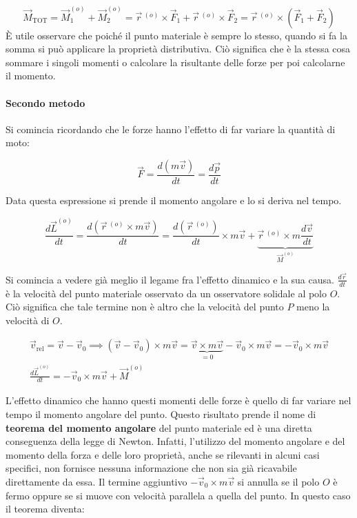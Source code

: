 \[
	\vec{M}_{\text{TOT}}=\vec{M}^{(o)}_1+\vec{M}^{(o)}_2= \vec{r}\,^{(o)} \times\vec{F}_1+\vec{r}\,^{(o)} \times \vec{F}_2= \vec{r}\,^{(o)} \times (\vec{F}_1+\vec{F}_2)
\]
È utile osservare che poiché il punto materiale è sempre lo stesso, quando si fa la somma si può applicare la proprietà distributiva. Ciò significa che è la stessa cosa sommare i singoli momenti o calcolare la risultante delle forze per poi calcolarne il momento.

\paragraph{Secondo metodo} Si comincia ricordando che le forze hanno l'effetto di far variare la quantità di moto:

\[
	\vec{F}=\frac{d(m\vec{v})}{dt}=\frac{d\vec{p}}{dt}
\]

Data questa espressione si prende il momento angolare e lo si deriva nel tempo.

\[
	\frac{d\vec{L}^{(o)}}{dt}=\frac{d(\vec{r}\,^{(o)}\times m\vec{v})}{dt}=\frac{d(\vec{r}\,^{(o)})}{dt}\times m\vec{v}+\underbrace{\vec{r}\,^{(o)}\times m\frac{d\vec{v}}{dt}}_{\vec{M}^{(o)}}
\]

Si comincia a vedere già meglio il legame fra l'effetto dinamico e la sua causa. $\frac{d\vec{r}}{dt}$ è la velocità del punto materiale osservato da un osservatore solidale al polo $O$. Ciò significa che tale termine non è altro che la velocità del punto $P$ meno la velocità di $O$.

\begin{gather*}
	\vec{v}_{\text{rel}}=\vec{v}-\vec{v}_0 \implies (\vec{v}-\vec{v}_0)\times m\vec{v}=\underbrace{\vec{v}\times m\vec{v}}_{=0}-\vec{v}_0 \times m\vec{v}=-\vec{v}_0 \times m\vec{v} \\
	\boxed{\frac{d\vec{L}^{(o)}}{dt} =-\vec{v}_0 \times m\vec{v}+ \vec{M}^{(o)}}
\end{gather*}

L'effetto dinamico che hanno questi momenti delle forze è quello di far variare nel tempo il momento angolare del punto. Questo risultato prende il nome di \textbf{teorema del momento angolare} del punto materiale ed è una diretta conseguenza della legge di Newton. Infatti, l'utilizzo del momento angolare e del momento della forza e delle loro proprietà, anche se rilevanti in alcuni casi specifici, non fornisce nessuna informazione che non sia già ricavabile direttamente da essa. Il termine aggiuntivo $-\vec{v}_0 \times m\vec{v}$ si annulla se il polo $O$ è fermo oppure se si muove con velocità parallela a quella del punto. In questo caso il teorema diventa:

